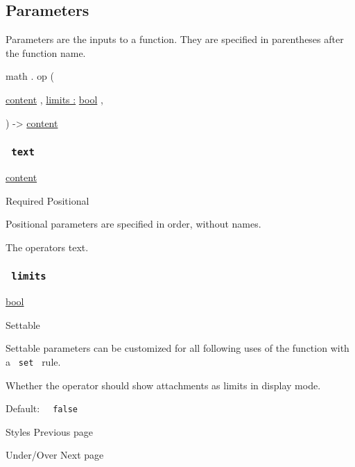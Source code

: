 \subsection{\texorpdfstring{{ Parameters
}}{ Parameters }}\label{parameters}

\label{parameters-tooltip}
Parameters are the inputs to a function. They are specified in
parentheses after the function name.

math { . } { op } (

{ \href{/docs/reference/foundations/content/}{content} , } {
\hyperref[parameters-limits]{limits :}
\href{/docs/reference/foundations/bool/}{bool} , }

) -\textgreater{} \href{/docs/reference/foundations/content/}{content}

\subsubsection{\texorpdfstring{\texttt{\ text\ }}{ text }}\label{parameters-text}

\href{/docs/reference/foundations/content/}{content}

{Required} {{ Positional }}

\label{parameters-text-positional-tooltip}
Positional parameters are specified in order, without names.

The operator\textquotesingle s text.

\subsubsection{\texorpdfstring{\texttt{\ limits\ }}{ limits }}\label{parameters-limits}

\href{/docs/reference/foundations/bool/}{bool}

{{ Settable }}

\label{parameters-limits-settable-tooltip}
Settable parameters can be customized for all following uses of the
function with a \texttt{\ set\ } rule.

Whether the operator should show attachments as limits in display mode.

Default: \texttt{\ }{\texttt{\ false\ }}\texttt{\ }

\href{/docs/reference/math/styles/}{\pandocbounded{}}

{ Styles } { Previous page }

\href{/docs/reference/math/underover/}{\pandocbounded{}}

{ Under/Over } { Next page }
